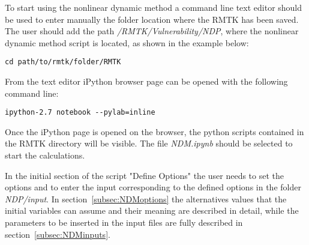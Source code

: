 To start using the nonlinear dynamic method a command line text editor should be used to enter manually the folder location where the RMTK has been saved. The user should add the path \textit{/RMTK/Vulnerability/NDP}, where the nonlinear dynamic method script is located, as shown in the example below:

\begin{Verbatim}[frame=single, commandchars=\\\{\}, samepage=true]
cd path/to/rmtk/folder/RMTK
\end{Verbatim}

From the text editor iPython browser page can be opened with the following command line:

\begin{Verbatim}[frame=single, commandchars=\\\{\}, samepage=true]
ipython-2.7 notebook --pylab=inline
\end{Verbatim}

Once the iPython page is opened on the browser, the python scripts contained in the RMTK directory will be visible. The file \textit{NDM.ipynb} should be selected to start the calculations.

In the initial section of the script "Define Options" the user needs to set the options and to enter the input corresponding to the defined options in the folder \textit{NDP/input}. In section~\ref{subsec:NDMoptions} the alternatives values that the initial variables can assume and their meaning are described in detail, while the parameters to be inserted in the input files are fully described in section~\ref{subsec:NDMinputs}.